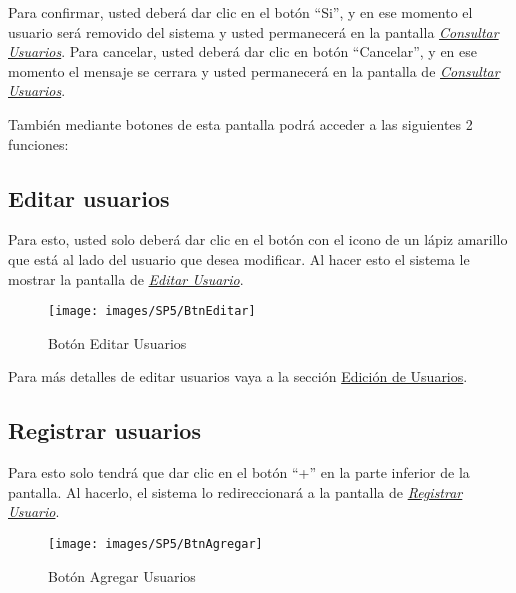 \begin{enumerate}
                Para confirmar, usted deberá dar clic en el botón “Si”, y en ese momento el usuario será removido del sistema y usted permanecerá en la pantalla \hyperlink{consultarUs}{\textit{Consultar Usuarios}}.
                Para cancelar, usted deberá dar clic en botón “Cancelar”, y en ese momento el mensaje se cerrara y usted permanecerá en la pantalla de \hyperlink{consultarUs}{\textit{Consultar Usuarios}}.\\
        
        \end{enumerate}

        También mediante botones de esta pantalla podrá acceder a las siguientes 2 funciones:

        \subsection{Editar usuarios}

            Para esto, usted solo deberá dar clic en el botón con el icono de un lápiz amarillo que está al lado del usuario que desea modificar. Al hacer esto el sistema le mostrar la pantalla   de \hyperlink{editarUs}{\textit{Editar Usuario}}.
            
            \begin{figure}[!hbtp]
                \centering
                \hypertarget{editar}{\texttt{[image: images/SP5/BtnEditar]}}
                \caption{Botón Editar Usuarios}
                \label{editar}
            \end{figure}
            
            Para más detalles de editar usuarios vaya a la sección \hyperref[editar-user]{Edición de Usuarios}.
        
        \subsection{Registrar  usuarios}

            Para esto solo tendrá que dar clic en el botón “+” en la parte inferior de la pantalla. Al hacerlo, el sistema  lo redireccionará a la pantalla de \hyperlink{registrarUs}{\textit{Registrar Usuario}}.
        
            \begin{figure}[!hbtp]
                \centering
                \hypertarget{add}{\texttt{[image: images/SP5/BtnAgregar]}}
                \caption{Botón Agregar Usuarios}
                \label{add}
            \end{figure}
    

